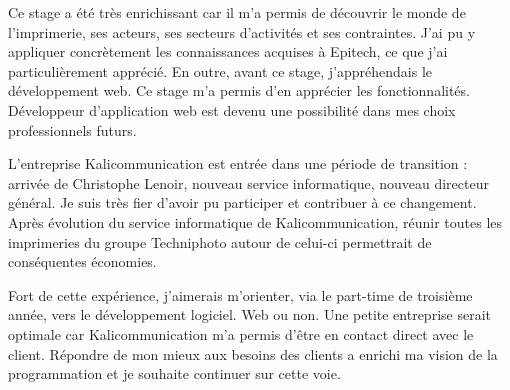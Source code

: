 \vspace*{2cm}
Ce stage a été très enrichissant car il m'a permis de découvrir le monde de l'imprimerie, ses acteurs, ses secteurs d'activités et ses contraintes. J'ai pu y appliquer concrètement les connaissances acquises à Epitech, ce que j'ai particulièrement apprécié. En outre, avant ce stage, j'appréhendais le développement web. Ce stage m'a permis d'en apprécier les fonctionnalités. Développeur d'application web est devenu une possibilité dans mes choix professionnels futurs.\newline

L'entreprise Kalicommunication est entrée dans une période de transition : arrivée de Christophe Lenoir, nouveau service informatique, nouveau directeur général.\newline
Je suis très fier d'avoir pu participer et contribuer à ce changement. Après évolution du service informatique de Kalicommunication, réunir toutes les imprimeries du groupe Techniphoto autour de celui-ci permettrait de conséquentes économies.\newline

Fort de cette expérience, j'aimerais m'orienter, via le part-time de troisième année, vers le développement logiciel. Web ou non. Une petite entreprise serait optimale car Kalicommunication m'a permis d'être en contact direct avec le client. Répondre de mon mieux aux besoins des clients a enrichi ma vision de la programmation et je souhaite continuer sur cette voie.